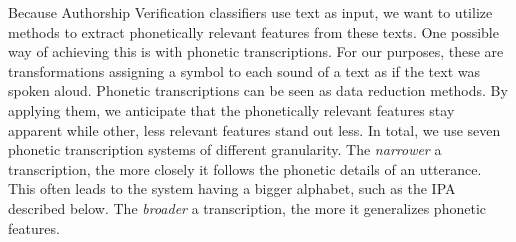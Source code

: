 Because Authorship Verification classifiers use text as input, we want to utilize methods to extract phonetically relevant features from these texts.
One possible way of achieving this is with phonetic transcriptions.
For our purposes, these are transformations assigning a symbol to each sound of a text as if the text was spoken aloud.
Phonetic transcriptions can be seen as data reduction methods.
By applying them, we anticipate that the phonetically relevant features stay apparent while other, less relevant features stand out less.
In total, we use seven phonetic transcription systems of different granularity.
The \textit{narrower} a transcription, the more closely it follows the phonetic details of an utterance.
This often leads to the system having a bigger alphabet, such as the IPA described below.
The \textit{broader} a transcription, the more it generalizes phonetic features.\\

